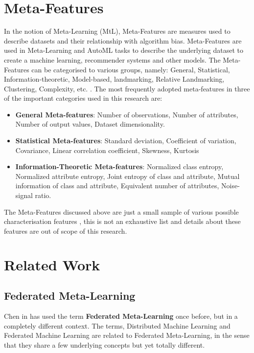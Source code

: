 \section{Meta-Features}
\label{meta-feat-realted-work}
In the notion of Meta-Learning (MtL), Meta-Features are measures used to describe datasets and their relationship with algorithm bias. Meta-Features are used in Meta-Learning and AutoML tasks to describe the underlying dataset to create a machine learning, recommender systems and other models. The Meta-Features can be categorised to various groups, namely: General, Statistical, Information-theoretic, Model-based, landmarking, Relative Landmarking, Clustering, Complexity, etc. \citep{meta-features-1} \citep{meta-features-2} \citep{meta-features-3}. The most frequently adopted meta-features in three of the important categories used in this research are:
\begin{itemize}
    \item \textbf{General Meta-features}:
    Number of observations, Number of attributes, Number of output values, Dataset dimensionality.
    
    \item \textbf{Statistical Meta-features}:
    Standard deviation, Coeﬃcient of variation, Covariance, Linear correlation coeﬃcient, Skewness, Kurtosis
    
    \item \textbf{Information-Theoretic Meta-features}:
    Normalized class entropy, Normalized attribute entropy, Joint entropy of class and attribute, Mutual information of class and attribute, Equivalent number of attributes, Noise-signal ratio.
\end{itemize}

The Meta-Features discussed above are just a small sample of various possible characterisation features \citep{meta-features-1} \citep{meta-features-2} \citep{meta-features-3} , this is not an exhaustive list and details about these features are out of scope of this research.

\section{Related Work}

\subsection{Federated Meta-Learning}
Chen in \citep{chen-et-al} has used the term \textbf{Federated Meta-Learning} once before, but in a completely different context. The terms, Distributed Machine Learning \citep{disml} and Federated Machine Learning \citep{fedml-google} are related to Federated Meta-Learning, in the sense that they share a few underlying concepts but yet totally different.

